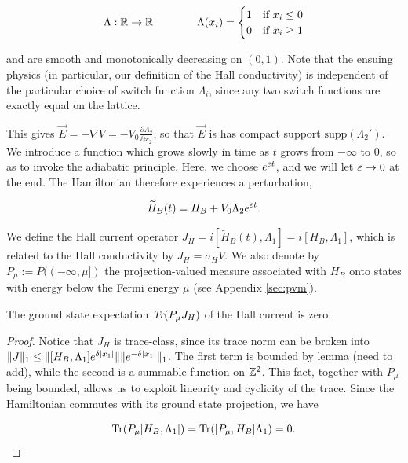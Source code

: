 \documentclass[12pt, letterpaper]{article}
\begin{document}
\[\Lambda : \mathbb{R}\to\mathbb{R} \quad\quad\quad\quad \Lambda(x_i) = \begin{cases} 1 & \text{if } x_i \leq 0 \\ 0 & \text{if } x_i \geq1\end{cases}\]

and are smooth and monotonically decreasing on $(0,1)$. Note that the ensuing physics (in particular, our definition of the Hall conductivity) is independent of the particular choice of switch function $\Lambda_i$, since any two switch functions are exactly equal on the lattice. 

This gives $\vec{E}=-\nabla V = -V_0\frac{\partial \Lambda_2}{\partial x_2}$, so that $\vec{E}$ is has compact support $\text{supp}(\Lambda_2')$. We introduce a function which grows slowly in time as $t$ grows from $-\infty$ to 0, so as to invoke the adiabatic principle. Here, we choose $e^{\varepsilon t}$, and we will let $\varepsilon\to 0$ at the end. The Hamiltonian therefore experiences a perturbation, 

\[\widetilde{H}_B(t) = H_B + V_0\Lambda_2 e^{\varepsilon t}.\]

We define the Hall current operator $J_H = i[\widetilde{H}_B(t), \Lambda_1] = i[H_B,\Lambda_1]$, which is related to the Hall conductivity by $J_H = \sigma_H V$. We also denote by $P_\mu := P((-\infty,\mu])$ the projection-valued measure associated with $H_B$ onto states with energy below the Fermi energy $\mu$ (see Appendix \ref{sec:pvm}).

\begin{lemma}
The ground state expectation $\emph{Tr}(P_\mu J_H)$ of the Hall current is zero.
\label{lemma:groundstatecurrent}
\end{lemma}
\begin{proof}
Notice that $J_H$ is trace-class, since its trace norm can be broken into $\lVert J \rVert_1 \leq \lVert [H_B,\Lambda_1]e^{\delta|x_1|} \rVert\lVert e^{-\delta|x_1|} \rVert_1$. The first term is bounded by lemma (need to add), while the second is a summable function on $\mathbb{Z}^2$. This fact, together with $P_\mu$ being bounded, allows us to exploit linearity and cyclicity of the trace. Since the Hamiltonian commutes with its ground state projection, we have 

\[\text{Tr}(P_\mu [H_B, \Lambda_1]) = \text{Tr}([P_\mu, H_B] \Lambda_1) = 0.\]

\end{proof}
\end{document}
